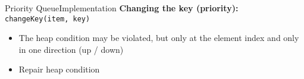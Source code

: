 \begin{frame}{Priority Queue}{Implementation}
  \textbf{Changing the key (priority):}
   {\color{Mittel-Blau}\texttt{changeKey(item, key)}}
     \begin{figure}[!h]
      \begin{adjustbox}{height=0.275\linewidth}
      \end{adjustbox}
      \hspace{0.25em}\hspace{-1.5em}
      \begin{adjustbox}{height=0.275\linewidth}
      \end{adjustbox}
      \label{fig:priority_queue:impl_change_key2}%
    \end{figure}%
  \begin{itemize}
    \item<2->
      The {\color{Mittel-Blau}heap condition} may be violated, but only at the
      element index and only in one direction (up / down)
    \item<3->
      Repair {\color{Mittel-Blau}heap condition}
  \end{itemize}
\end{frame}


